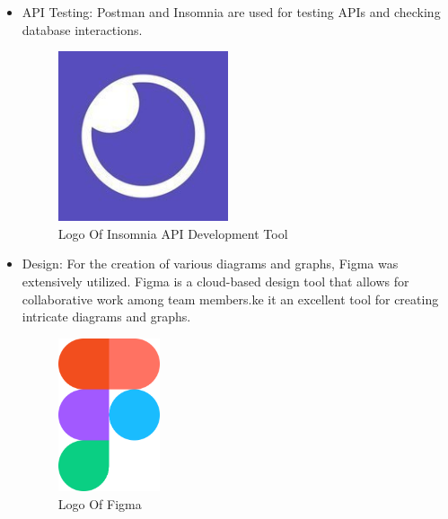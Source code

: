 \begin{itemize}
    \item API Testing: Postman and Insomnia \cite{insomnia} are used for testing APIs and checking database interactions. \\
          \begin{figure}[H]
              \centering
              \includegraphics[width=5cm]{src/assets/logos/insomnia.jpg}
              \caption{  Logo Of Insomnia API Development Tool }
              \label{fig:Insomnia_Logo}
          \end{figure}
    \newpage      
    \item Design: For the creation of various diagrams and graphs, {\color{purple}Figma} \cite{figma} was extensively utilized. Figma is a cloud-based design tool that allows for collaborative work among team members.ke it an excellent tool for creating intricate diagrams and graphs.\\
          \begin{figure}[H]
              \centering
              \includegraphics[width=3cm]{src/assets/logos/1024px-Figma-logo.svg.png}
              \caption{  Logo Of Figma }
              \label{fig: Figma_Logo}
          \end{figure}
\end{itemize}

